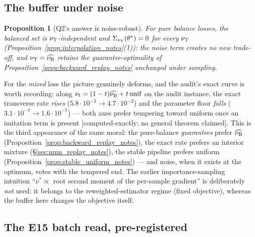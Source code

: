 \documentclass[11pt]{article}
\newtheorem{proposition}[theorem]{Proposition}
\theoremstyle{definition}
\theoremstyle{remark}
\def\lambda{\widehat\nuB}
\begin{document}
\subsection{The buffer under noise}\label{sec:buffer_noise_notes}

\begin{proposition}[Q2's answer is noise-robust]\label{prop:buffer_robust_notes}
For pure balance losses, the balanced set is $\nu_{\mathrm{T}}$-independent and
$\Sigma_{\nu_{\mathrm{T}}}(\theta^*)=0$ for \emph{every} $\nu_{\mathrm{T}}$
(Proposition~\ref{prop:interpolation_notes}(1)): the noise term creates no new trade-off, and
$\nutrain=\lambda$ retains the guarantee-optimality of
Proposition~\ref{prop:backward_replay_notes} unchanged under sampling.
\end{proposition}

For the \emph{mixed} loss the picture genuinely deforms, and the audit's exact curve is
worth recording: along $\nu_t = (1-t)\lambda + t\,\mathrm{unif}$ on the audit instance,
the exact transverse rate \emph{rises} ($5.8\cdot10^{-3}\to4.7\cdot10^{-2}$) and the
parameter floor \emph{falls} ($3.1\cdot10^{-7}\to1.6\cdot10^{-7}$) --- both axes prefer
tempering toward uniform once an imitation term is present [computed-exactly; no general
theorem claimed]. This is the third appearance of the same moral: the pure-balance
\emph{guarantees} prefer $\lambda$ (Proposition~\ref{prop:backward_replay_notes}), the exact
rate prefers an interior mixture (\S\ref{sec:num_replay_notes}), the stable pipeline prefers
uniform (Proposition~\ref{prop:stable_uniform_notes}) --- and noise, when it exists at the
optimum, votes with the tempered end. The earlier importance-sampling intuition
``$\nu^*\propto$ root second moment of the per-sample gradient'' is deliberately
\emph{not} used: it belongs to the reweighted-estimator regime (fixed objective), whereas
the buffer here changes the objective itself.

\subsection{The E15 batch read, pre-registered}\label{sec:e15_batch_notes}
\end{document}
